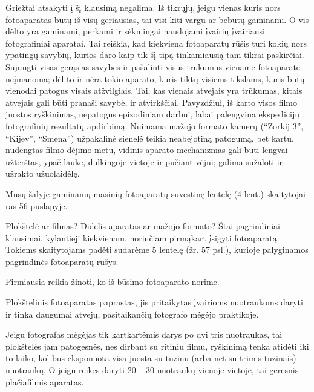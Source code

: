 \documentclass[12pt]{book}
\begin{document}
			Griežtai atsakyti į šį klausimą negalima. Iš tikrųjų, jeigu vienas kuris nors fotoaparatas būtų iš visų geriausias, tai visi kiti vargu ar bebūtų gaminami. O vis dėlto yra gaminami, perkami ir sėkmingai naudojami įvairių įvairiausi fotografiniai aparatai. Tai reiškia, kad kiekviena fotoaparatų rūšis turi kokių nors ypatingų savybių, kurios daro kaip tik šį tipą tinkamiausią tam tikrai paskirčiai. Sujungti visas gerąsias savybes ir pašalinti visus trūkumus viename fotoaparate neįmanoma; dėl to ir nėra tokio aparato, kuris tiktų visiems tikslams, kuris būtų vienodai patogus visais atžvilgiais. Tai, kas vienais atvejais yra trūkumas, kitais atvejais gali būti pranaši savybė, ir atvirkščiai. Pavyzdžiui, iš karto visos filmo juostos ryškinimas, nepatogus epizodiniam darbui, labai palengvina ekspedicijų fotografinių rezultatų apdirbimą. Nuimama mažojo formato kamerų (``Zorkij 3'', ``Kijev'', ``Smena'') užpakalinė sienelė teikia neabejotiną patogumą, bet kartu, nudengtas filmo dėjimo metu, vidinis aparato mechanizmas gali būti lengvai užterštas, ypač lauke, dulkingoje vietoje ir pučiant vėjui; galima sužaloti ir užrakto užuolaidėlę.

			Mūsų šalyje gaminamų masinių fotoaparatų suvestinę lentelę (4 lent.) skaitytojai ras 56 puslapyje.

			Plokštelė ar filmas? Didelis aparatas ar mažojo formato? Štai pagrindiniai klausimai, kylantieji kiekvienam, norinčiam pirmąkart įsigyti fotoaparatą. Tokiems skaitytojams padėti sudarėme 5 lentelę (žr. 57 psl.), kurioje palyginamos pagrindinės fotoaparatų rūšys.

			Pirmiausia reikia žinoti, ko iš būsimo fotoaparato norime.

			Plokštelinis fotoaparatas paprastas, jis pritaikytas įvairioms nuotraukoms daryti ir tinka daugumai atvejų, pasitaikančių fotografo mėgėjo praktikoje.

			Jeigu fotografas mėgėjas tik kartkartėmis darys po dvi tris nuotraukas, tai plokštelės jam patogesnės, nes dirbant su ritiniu filmu, ryškinimą tenka atidėti iki to laiko, kol bus eksponuota visa juosta su tuzinu (arba net su trimis tuzinais) nuotraukų. O jeigu reikės daryti 20 -- 30 nuotraukų vienoje vietoje, tai geresnis plačiafilmis aparatas.
\end{document}

